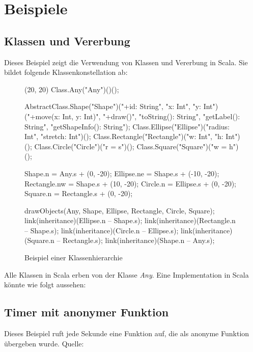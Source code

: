 \chapter{Beispiele}


\section{Klassen und Vererbung}

Dieses Beispiel zeigt die Verwendung von Klassen und Vererbung in
Scala. Sie bildet folgende Klassenkonstellation ab:

\begin{figure}[H]
	\centering
	\begin{emp}[classdiag](20, 20)
		Class.Any("Any")()();

		AbstractClass.Shape("Shape")("+id: String", "x: Int", "y: Int")
			("+move(x: Int, y: Int)", "+draw()", "toString(): String", "getLabel(): String", "getShapeInfo(): String");
		Class.Ellipse("Ellipse")("radius: Int", "stretch: Int")();
		Class.Rectangle("Rectangle")("w: Int", "h: Int")();
		Class.Circle("Circle")("{r = s}")();
		Class.Square("Square")("{w = h}")();

		Shape.n = Any.s + (0, -20);
		Ellipse.ne = Shape.s + (-10, -20);
		Rectangle.nw = Shape.s + (10, -20);
		Circle.n = Ellipse.s + (0, -20);
		Square.n = Rectangle.s + (0, -20);

		drawObjects(Any, Shape, Ellipse, Rectangle, Circle, Square);
		link(inheritance)(Ellipse.n -- Shape.s);
		link(inheritance)(Rectangle.n -- Shape.s);
		link(inheritance)(Circle.n -- Ellipse.s);
		link(inheritance)(Square.n -- Rectangle.s);
		link(inheritance)(Shape.n -- Any.s);

	\end{emp}
	\caption{Beispiel einer Klassenhierarchie}
	\label{fig:covariance}
\end{figure}

Alle Klassen in Scala erben von der Klasse \emph{Any}.
Eine Implementation in Scala könnte wie folgt aussehen: 




\section{Timer mit anonymer Funktion}

Dieses Beispiel ruft jede Sekunde eine Funktion auf, die als
anonyme Funktion übergeben wurde.
Quelle: \cite{scalaTutorial}


